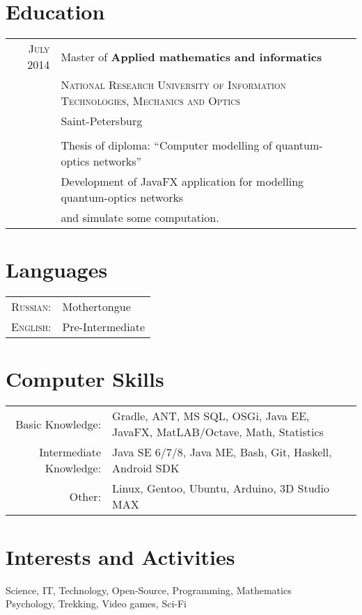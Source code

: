 \documentclass[a4paper,10pt]{article}
\begin{document}
\section{Education}
	\begin{tabular}{rl}	
	  \textsc{July} 2014 & Master of \textbf{Applied mathematics and informatics} \\& \textsc{National Research University of Information Technologies, Mechanics and Optics}\\& Saint-Petersburg\\\\
			& Thesis of diploma: ``Computer modelling of quantum-optics networks''\\&
			Development of JavaFX application for modelling quantum-optics networks \\&and simulate some computation.
	\end{tabular}

\section{Languages}
	\begin{tabular}{rl}
		\textsc{Russian:}&Mothertongue\\
		\textsc{English:}&Pre-Intermediate\\
	\end{tabular}

\section{Computer Skills}
	\begin{tabular}{rl}
		Basic Knowledge:& Gradle, ANT, MS SQL, OSGi, Java EE, JavaFX, MatLAB/Octave, Math, Statistics \\
		Intermediate Knowledge:& Java SE 6/7/8, Java ME, Bash, Git, Haskell, Android SDK \\
		Other:& Linux, Gentoo, Ubuntu, Arduino, 3D Studio MAX
	\end{tabular}

\section{Interests and Activities}
	Science, IT, Technology, Open-Source, Programming, Mathematics \\
	Psychology, Trekking, Video games, Sci-Fi 
\end{document}
